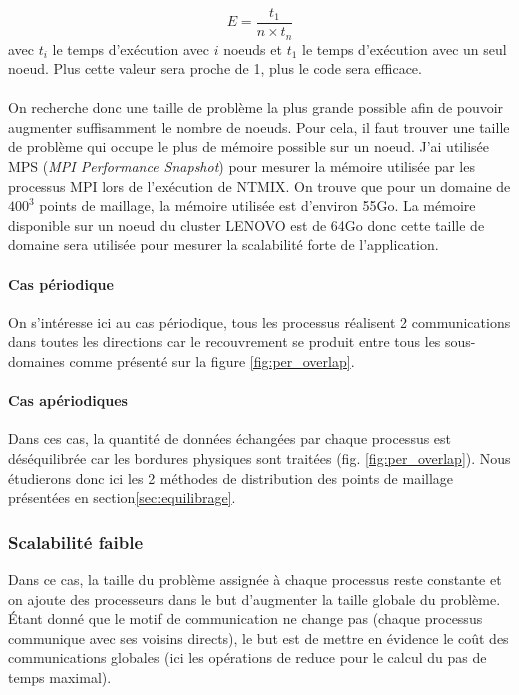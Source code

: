$$E=\frac{t_1}{n\times t_n}$$ avec $t_i$ le temps d'exécution avec $i$ noeuds et $t_1$ le temps d'exécution avec un seul noeud. Plus cette valeur sera proche de 1, plus le code sera efficace.

\paragraph{}On recherche donc une taille de problème la plus grande possible afin de pouvoir augmenter suffisamment le nombre de noeuds. Pour cela, il faut trouver une taille de problème qui occupe le plus de mémoire possible sur un noeud. J'ai utilisée MPS (\textit{MPI Performance Snapshot}) pour mesurer la mémoire utilisée par les processus MPI lors de l'exécution de NTMIX. On trouve que pour un domaine de $400^3$ points de maillage, la mémoire utilisée est d'environ 55Go. La mémoire disponible sur un noeud du cluster LENOVO est de 64Go donc cette taille de domaine sera utilisée pour mesurer la scalabilité forte de l'application.



\paragraph{Cas périodique}
On s'intéresse ici au cas périodique, tous les processus réalisent 2 communications dans toutes les directions car le recouvrement se produit entre tous les sous-domaines comme présenté sur la figure \ref{fig:per_overlap}. 


\paragraph{Cas apériodiques}
Dans ces cas, la quantité de données échangées par chaque processus est déséquilibrée car les bordures physiques sont traitées (fig. \ref{fig:per_overlap}). Nous étudierons donc ici les 2 méthodes de distribution des points de maillage présentées en section\ref{sec:equilibrage}.






\subsubsection{Scalabilité faible}\label{sec:scal-weak}
Dans ce cas, la taille du problème assignée à chaque processus reste constante et on ajoute des processeurs dans le but d'augmenter la taille globale du problème. Étant donné que le motif de communication ne change pas (chaque processus communique avec ses voisins directs), le but est de mettre en évidence le coût des communications globales (ici les opérations de reduce pour le calcul du pas de temps maximal).


